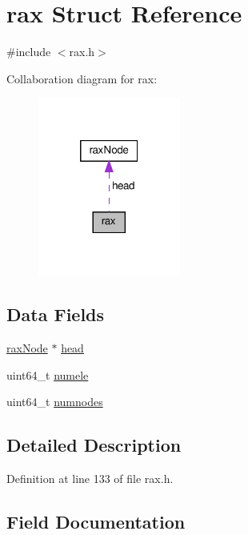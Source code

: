 \hypertarget{structrax}{}\section{rax Struct Reference}
\label{structrax}


{\ttfamily \#include $<$rax.\+h$>$}



Collaboration diagram for rax\+:
\nopagebreak
\begin{figure}[H]
\begin{center}
\leavevmode
\includegraphics[width=133pt]{structrax__coll__graph}
\end{center}
\end{figure}
\subsection*{Data Fields}
\begin{DoxyCompactItemize}
\item 
\hyperlink{structrax_node}{rax\+Node} $\ast$ \hyperlink{structrax_aa897900ec39b611670ffa8a692432543}{head}
\item 
uint64\+\_\+t \hyperlink{structrax_aeb57ec87f1c4514577f9ed22bfc1041d}{numele}
\item 
uint64\+\_\+t \hyperlink{structrax_abbdb3a945f35e1cd7a50bcabf1bb6828}{numnodes}
\end{DoxyCompactItemize}


\subsection{Detailed Description}


Definition at line 133 of file rax.\+h.



\subsection{Field Documentation}
\mbox{\label{structrax_aa897900ec39b611670ffa8a692432543}} 
